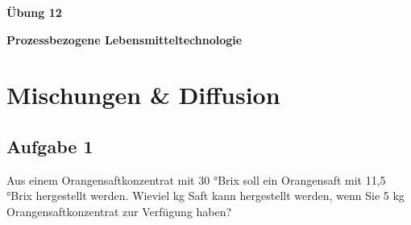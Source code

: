 \documentclass[a4paper,11pt]{article}
\newif\ifshowme
\begin{document}


\bckgrnd


\begin{center}
\LARGE
\color{white}
\textbf{Übung 12} \par \vspace*{2mm}
\large \color{miugray} \textbf{Prozessbezogene Lebensmitteltechnologie}
\end{center}
\par 
\vspace*{6mm}


\color{miudiutex}
\section*{Mischungen \& Diffusion}

\subsection*{Aufgabe 1}
Aus einem Orangensaftkonzentrat mit 30 °Brix soll ein Orangensaft mit 11,5 °Brix hergestellt
werden. Wieviel kg Saft kann hergestellt werden, wenn Sie 5 kg Orangensaftkonzentrat zur
Verfügung haben?



\ifshowme
\antwort{
$m_1 = 5~\text{kg};~m_2 = m_1 + m_3 ;~m_3 = ~?~;~x_1=30~\text{°};~x_2=11,5~\text{°};~x_3=0~\text{°}$
\begin{align*}
m_1 \cdot x_1 + m_3 \cdot x_3 &= m_2 \cdot x_2 \\
m_1 \cdot x_1 + m_3 \cdot x_3 &= m_1 \cdot x_2 + m_3 \cdot x_2 \\
m_1 \cdot x_1 + m_3 \cdot x_3 - m_1 \cdot x_2 &= m_3 \cdot x_2 \\
m_1 \cdot x_1 - m_1 \cdot x_2 &= m_3 \cdot x_2 - m_3 \cdot x_3\\
m_1 \cdot x_1 - m_1 \cdot x_2 &= m_3 \cdot (x_2 - x_3)\\
\frac{m_1 \cdot x_1 - m_1 \cdot x_2}{x_2 - x_3} &= m_3 = 8,04
\end{align*}
Wir können also zu unseren vorhandenen 5 kg Orangensaftkonzentrat weitere 8,04 kg Wasser hinzugeben um einen °Brix von 11,5 zu erreichen. Dementsprechend erhalten wir 13,04 kg Orangensaft.

}
\pagebreak
\else
\fi
\end{document}

